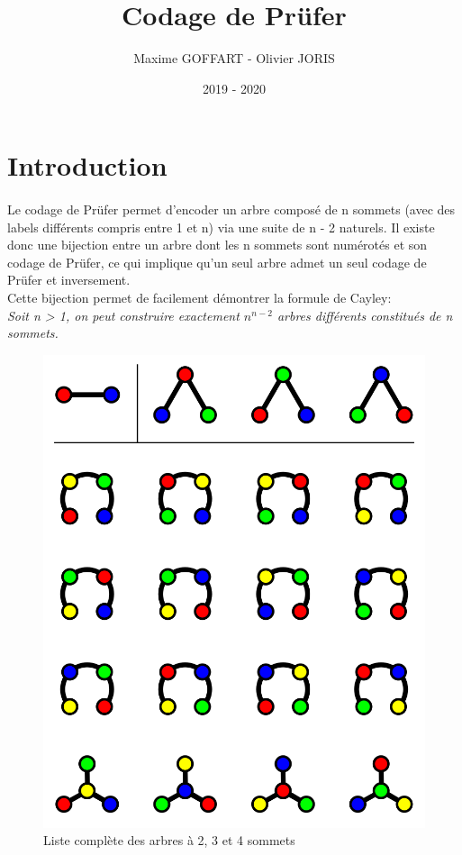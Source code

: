 \documentclass[a4paper, 11pt, oneside]{article}
\title{Codage de Prüfer}
\author{Maxime GOFFART - Olivier JORIS}
\date{2019 - 2020}
\begin{document}
\maketitle
\newpage

\tableofcontents
\newpage

\section{Introduction}

\paragraph{}
Le codage de Prüfer permet d'encoder un arbre composé de n sommets (avec des labels différents compris entre 1 et n) via une suite de n - 2 naturels. Il existe donc une bijection entre un arbre dont les n sommets sont numérotés et son codage de Prüfer, ce qui implique qu'un seul arbre admet un seul codage de Prüfer et inversement.\\
Cette bijection permet de facilement démontrer la formule de Cayley:\\
\textit{Soit n > 1, on peut construire exactement $n^{n-2}$ arbres différents constitués de n sommets.}

\begin{figure}[H]
	\centering
	\includegraphics[scale=0.2]{formule_Cayley.png} 
	\caption{Liste complète des arbres à 2, 3 et 4 sommets\protect\footnotemark}
\end{figure}
\end{document}
